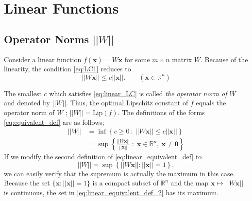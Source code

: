 \documentclass[12pt]{report}
\numberwithin{figure}{chapter}
\theoremstyle{plain}
\theoremstyle{definition}
\theoremstyle{corollary}
\theoremstyle{definition}
\theoremstyle{plain}
\theoremstyle{definition}
\theoremstyle{plain}
\newcommand\bs[1]{\ensuremath{\boldsymbol{#1}}}
\newcommand\bx{\ensuremath{\boldsymbol x}}
\newcommand\lip{\ensuremath{\text{Lip}}}
\begin{document}
\section{Linear Functions}

%
\subsection{Operator Norms \(||W||\)}

Consider a linear function \(f(\bx)=W\bx\) for some \(m\times n\) matrix \(W\).
Because of the linearity, the condition \eqref{eq:LC1} reduces to
\begin{equation}\label{eq:linear_LC}
||W\bx||\le c||\bx||.\qquad(\bx\in\mathbb R^n)
\end{equation}

The smallest \(c\) which satisfies \eqref{eq:linear_LC} is called \emph{the operator norm of \(W\)} and denoted by \(||W||\).
Thus, the optimal Lipschitz constant of \(f\) equals the operator norm of \(W\) ; \(||W||=\lip(f)\).
The definitions of the forms \eqref{eq:equivalent_def} are as follows;
\begin{equation}\label{eq:linear_equivalent_def}\begin{aligned}
||W||
&=\inf\left\{c\ge0\::\: ||W\bx||\le c||\bx||\right\}\\
&=\sup\left\{\frac{||W\bx||}{||\bx||}\;:\;\bx\in\mathbb R^n,\:\bx\neq\bs0\right\}
\end{aligned}\end{equation}
If we modify the second definition of \eqref{eq:linear_equivalent_def} to
\begin{equation}\label{eq:linear_equivalent_def_2}
||W||=\sup\left\{||W\bx||:||\bx||=1\right\},
\end{equation}
we can easily verify that the supremum is actually the maximum in this case.
Because the set \(\{\bx:||\bx||=1\}\) is a compact subset of \(\mathbb R^n\) and the map \(\bx\mapsto||W\bx||\) is continuous, the set in \eqref{eq:linear_equivalent_def_2} has its maximum.
\end{document}
